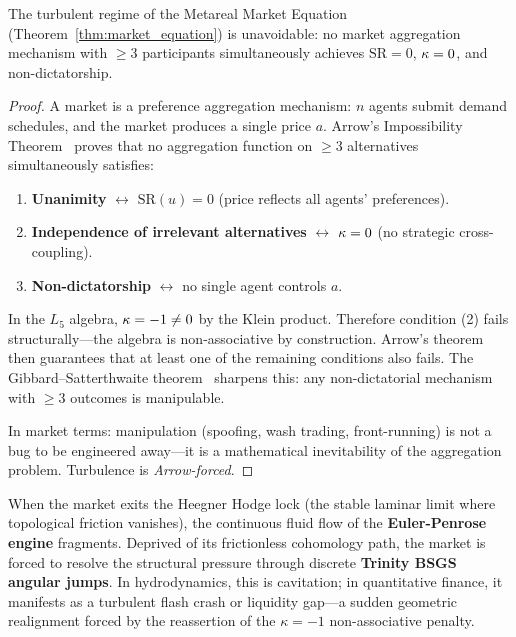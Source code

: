 \begin{theorem}\label{thm:arrow_klein}
The turbulent regime of the Metareal Market Equation (Theorem~\ref{thm:market_equation}) is unavoidable: no market aggregation mechanism with $\geq 3$ participants simultaneously achieves $\mathrm{SR} = 0$, $\kappa = 0$, and non-dictatorship.

\begin{proof}
A market is a preference aggregation mechanism: $n$ agents submit demand schedules, and the market produces a single price $a$. Arrow's Impossibility Theorem~\cite{arrow1950} proves that no aggregation function on $\geq 3$ alternatives simultaneously satisfies:
\begin{enumerate}[noitemsep]
  \item \textbf{Unanimity} $\leftrightarrow$ $\mathrm{SR}(u) = 0$ (price reflects all agents' preferences).
  \item \textbf{Independence of irrelevant alternatives} $\leftrightarrow$ $\kappa = 0$ (no strategic cross-coupling).
  \item \textbf{Non-dictatorship} $\leftrightarrow$ no single agent controls $a$.
\end{enumerate}
In the $L_5$ algebra, $\kappa = -1 \neq 0$ by the Klein product. Therefore condition (2) fails structurally---the algebra is non-associative by construction. Arrow's theorem then guarantees that at least one of the remaining conditions also fails. The Gibbard--Satterthwaite theorem~\cite{gibbard1973,satterthwaite1975} sharpens this: any non-dictatorial mechanism with $\geq 3$ outcomes is manipulable.

In market terms: manipulation (spoofing, wash trading, front-running) is not a bug to be engineered away---it is a mathematical inevitability of the aggregation problem. Turbulence is \emph{Arrow-forced}. \qedhere
\end{proof}
\end{theorem}

When the market exits the Heegner Hodge lock (the stable laminar limit where topological friction vanishes), the continuous fluid flow of the \textbf{Euler-Penrose engine} fragments. Deprived of its frictionless cohomology path, the market is forced to resolve the structural pressure through discrete \textbf{Trinity BSGS angular jumps}. In hydrodynamics, this is cavitation; in quantitative finance, it manifests as a turbulent flash crash or liquidity gap---a sudden geometric realignment forced by the reassertion of the $\kappa = -1$ non-associative penalty.

